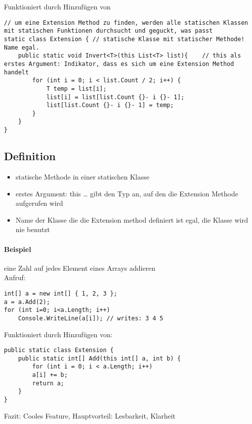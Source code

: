Funktioniert durch Hinzufügen von
\begin{lstlisting}[language={[Sharp]C}]
// um eine Extension Method zu finden, werden alle statischen Klassen mit statischen Funktionen durchsucht und geguckt, was passt
static class Extension { // statische Klasse mit statischer Methode! Name egal.
	public static void Invert<T>(this List<T> list){	// this als erstes Argument: Indikator, dass es sich um eine Extension Method handelt
		for (int i = 0; i < list.Count / 2; i++) { 
			T temp = list[i]; 
			list[i] = list[list.Count {}- i {}- 1];  
			list[list.Count {}- i {}- 1] = temp; 
		} 
	}
}
\end{lstlisting}


\subsection{Definition}

\begin{itemize}
\item statische Methode in einer statischen Klasse
\item erstes Argument: this … gibt den Typ an, auf den die Extension Methode aufgerufen wird
\item Name der Klasse die die Extension method definiert ist egal, die Klasse wird nie benutzt
\end{itemize}

\paragraph{Beispiel} eine Zahl auf jedes Element eines Arrays addieren\\
Aufruf: 
\begin{lstlisting}[language={[Sharp]C}]
int[] a = new int[] { 1, 2, 3 }; 
a = a.Add(2); 
for (int i=0; i<a.Length; i++) 
	Console.WriteLine(a[i]); // writes: 3 4 5 
\end{lstlisting}
Funktioniert durch Hinzufügen von: 
\begin{lstlisting}[language={[Sharp]C}]
public static class Extension { 
	public static int[] Add(this int[] a, int b) { 
		for (int i = 0; i < a.Length; i++) 
		a[i] += b; 
		return a; 
	}
} 
\end{lstlisting}
Fazit: Cooles Feature, Hauptvorteil: Lesbarkeit, Klarheit